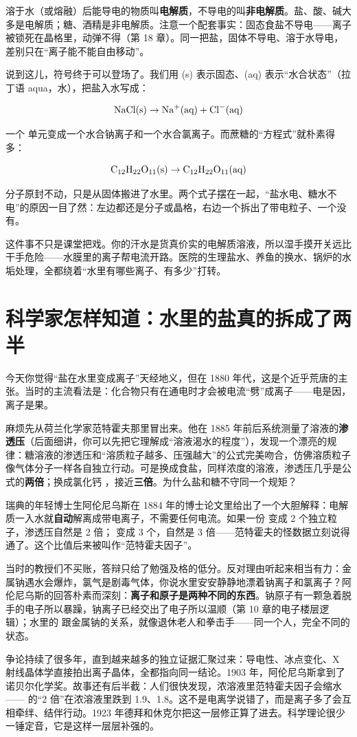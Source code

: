 溶于水（或熔融）后能导电的物质叫\textbf{电解质}，不导电的叫\textbf{非电解质}。盐、酸、碱大多是电解质；糖、酒精是非电解质。注意一个配套事实：固态食盐不导电——离子被锁死在晶格里，动弹不得（第 18 章）。同一把盐，固体不导电、溶于水导电，差别只在“离子能不能自由移动”。

说到这儿，符号终于可以登场了。我们用 (s) 表示固态、(aq) 表示“水合状态”（拉丁语 aqua，水），把盐入水写成：

\[\mathrm{NaCl(s)} \rightarrow \mathrm{Na^+(aq)} + \mathrm{Cl^-(aq)}\]

一个  单元变成一个水合钠离子和一个水合氯离子。而蔗糖的“方程式”就朴素得多：

\[\mathrm{C_{12}H_{22}O_{11}(s)} \rightarrow \mathrm{C_{12}H_{22}O_{11}(aq)}\]

分子原封不动，只是从固体搬进了水里。两个式子摆在一起，“盐水电、糖水不电”的原因一目了然：左边都还是分子或晶格，右边一个拆出了带电粒子、一个没有。

这件事不只是课堂把戏。你的汗水是货真价实的电解质溶液，所以湿手摸开关远比干手危险——水膜里的离子帮电流开路。医院的生理盐水、养鱼的换水、锅炉的水垢处理，全都绕着“水里有哪些离子、有多少”打转。

\section{科学家怎样知道：水里的盐真的拆成了两半}

\begin{zhengju}
今天你觉得“盐在水里变成离子”天经地义，但在 1880 年代，这是个近乎荒唐的主张。当时的主流看法是：化合物只有在通电时才会被电流“劈”成离子——电是因，离子是果。

麻烦先从荷兰化学家范特霍夫那里冒出来。他在 1885 年前后系统测量了溶液的\textbf{渗透压}（后面细讲，你可以先把它理解成“溶液渴水的程度”），发现一个漂亮的规律：糖溶液的渗透压和“溶质粒子越多、压强越大”的公式完美吻合，仿佛溶质粒子像气体分子一样各自独立行动。可是换成食盐，同样浓度的溶液，渗透压几乎是公式的\textbf{两倍}；换成氯化钙 ，接近\textbf{三倍}。为什么盐和糖不守同一个规矩？

瑞典的年轻博士生阿伦尼乌斯在 1884 年的博士论文里给出了一个大胆解释：电解质一入水就\textbf{自动}解离成带电离子，不需要任何电流。如果一份  变成 2 个独立粒子，渗透压自然是 2 倍； 变成 3 个，自然是 3 倍——范特霍夫的怪数据立刻说得通了。这个比值后来被叫作“范特霍夫因子”。

当时的教授们不买账，答辩只给了勉强及格的低分。反对理由听起来相当有力：金属钠遇水会爆炸，氯气是剧毒气体，你说水里安安静静地漂着钠离子和氯离子？阿伦尼乌斯的回答朴素而深刻：\textbf{离子和原子是两种不同的东西}。钠原子有一颗急着脱手的电子所以暴躁，钠离子已经交出了电子所以温顺（第 10 章的电子楼层逻辑）；水里的  跟金属钠的关系，就像退休老人和拳击手——同一个人，完全不同的状态。

争论持续了很多年，直到越来越多的独立证据汇聚过来：导电性、冰点变化、X 射线晶体学直接拍出离子晶体，全都指向同一结论。1903 年，阿伦尼乌斯拿到了诺贝尔化学奖。故事还有后半截：人们很快发现，浓溶液里范特霍夫因子会缩水—— 的“2 倍”在浓溶液里跌到 1.9、1.8。这不是电离学说错了，而是离子多了会互相牵绊、结伴行动。1923 年德拜和休克尔把这一层修正算了进去。科学理论很少一锤定音，它是这样一层层补强的。
\end{zhengju}


